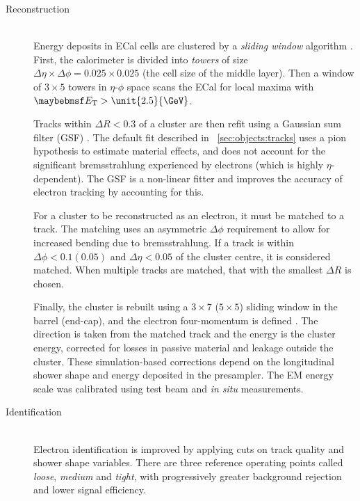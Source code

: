 \clearpage
\begin{description}
\item[Reconstruction] \hfill \\
	Energy deposits in ECal cells are clustered by a \textit{sliding window} 
	algorithm \cite{ElectronPerf:Expect}. First, the calorimeter is divided into 
	\textit{towers} of size $\Delta\eta \times \Delta\phi = 0.025 \times 0.025$ (the 
	cell size of the middle layer). Then a window of $3 \times 5$ towers in $\eta$-$\phi$ 
	space scans the ECal for local maxima with $\et > \unit{2.5}{\GeV}$.

	Tracks within $\Delta R < 0.3$ of a cluster are then refit using a Gaussian sum 
	filter (GSF) \cite{Electron:GSF}. The default fit described in 
	\Section~\ref{sec:objects:tracks} uses a pion hypothesis to estimate material 
	effects, and does not account for the significant bremsstrahlung experienced by 
	electrons (which is highly $\eta$-dependent). The GSF is a non-linear fitter and 
	improves the accuracy of electron tracking by accounting for this.

	For a cluster to be reconstructed as an electron, it must be matched to a track. The 
	matching uses an asymmetric $\Delta\phi$ requirement to allow for increased bending due 
	to bremsstrahlung. If a track is within $\Delta\phi < 0.1 (0.05)$ and 
	$\Delta\eta < 0.05$ of the cluster centre, it is considered matched. When multiple 
	tracks are matched, that with the smallest $\Delta R$ is chosen.

	Finally, the cluster is rebuilt using a $3 \times 7$ ($5 \times 5$) sliding window 
	in the barrel (end-cap), and the electron four-momentum is defined 
	\cite{ElectronPerf:2010}. The direction is taken from the matched track and the 
	energy is the cluster energy, corrected for losses in passive material and leakage 
	outside the cluster. These simulation-based corrections depend on the longitudinal 
	shower shape and energy deposited in the presampler. The EM energy scale was calibrated
	using test beam and \textit{in situ} \HepProcess{\PZ \HepTo \Pe\Pe} measurements.

\item[Identification] \hfill \\
	Electron identification is improved by applying cuts on track quality and shower 
	shape variables. There are three reference operating points called \textit{loose}, 
	\textit{medium} and \textit{tight}, with progressively greater background rejection 
	and lower signal efficiency.
	

\end{description}
